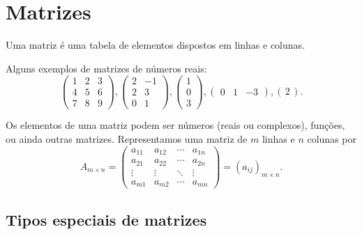 \section{Matrizes}

\begin{defi}
    Uma matriz é uma tabela de elementos dispostos em linhas e colunas.
\end{defi}

\begin{exemplo} Alguns exemplos de matrizes de números reais:
	\begin{equation*}
    	\begin{pmatrix}
        	1 &2 &3\\
            4 &5 &6\\
            7 &8 &9
        \end{pmatrix}, 
        \begin{pmatrix}
            2 & -1\\
            2 & 3\\
            0 & 1
        \end{pmatrix}, 
        \begin{pmatrix}
            1\\
            0\\
            3
        \end{pmatrix}, 
        \begin{pmatrix}
	        0 & 1 & -3     
        \end{pmatrix}, 
		\left( \, 2 \, \right).
    \end{equation*}
\end{exemplo}

Os elementos de uma matriz podem ser números (reais ou complexos), funções, ou ainda outras matrizes. Representamos uma matriz de $m$ linhas e $n$ colunas por
\begin{equation*}
    A_{m\times n} = \begin{pmatrix}
            a_{11} & a_{12} & \cdots & a_{1n}\\
            a_{21} & a_{22} & \cdots & a_{2n}\\
            \vdots & \vdots & \ddots & \vdots\\
            a_{m1} & a_{m2} & \cdots & a_{mn}
        \end{pmatrix} = (a_{ij})_{m\times n}.
\end{equation*}

\subsection{Tipos especiais de matrizes}

